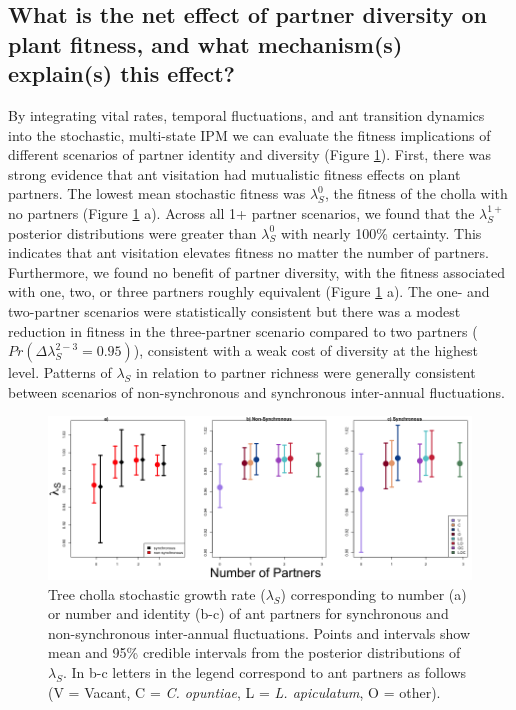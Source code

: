 \documentclass[11pt]{article}
\begin{document}
\subsection*{What is the net effect of partner diversity on plant fitness, and what mechanism(s) explain(s) this effect?}
By integrating vital rates, temporal fluctuations, and ant transition dynamics into the stochastic, multi-state IPM we can evaluate the fitness implications of different scenarios of partner identity and diversity (Figure \ref{fig:LambdaMeans}). 
First, there was strong evidence that ant visitation had mutualistic fitness effects on plant partners. 
The lowest mean stochastic fitness was $\lambda^{0}_{S}$, the fitness of the cholla with no partners (Figure \ref{fig:LambdaMeans} a).
Across all 1+ partner scenarios, we found that the $\lambda^{1+}_{S}$ posterior distributions were greater than $\lambda^{0}_{S}$ with nearly 100\% certainty.
This indicates that ant visitation elevates fitness no matter the number of partners.
Furthermore, we found no benefit of partner diversity, with the fitness associated with one, two, or three partners roughly equivalent (Figure \ref{fig:LambdaMeans} a).
The one- and two-partner scenarios were statistically consistent but there was a modest reduction in fitness in the three-partner scenario compared to two partners ($Pr(\Delta\lambda^{2-3}_{S}=0.95)$), consistent with a weak cost of diversity at the highest level.
Patterns of $\lambda_{S}$ in relation to partner richness were generally consistent between scenarios of non-synchronous and synchronous inter-annual fluctuations. 

\begin{figure}
	\includegraphics[width=0.91\linewidth]{Figures/Lambdas_Comp_lines.png}
	\caption{Tree cholla stochastic growth rate ($\lambda_{S}$) corresponding to number (a) or number and identity (b-c) of ant partners for synchronous and non-synchronous inter-annual fluctuations. Points and intervals show mean and 95\% credible intervals from the posterior distributions of $\lambda_{S}$. In b-c letters in the legend correspond to ant partners as follows (V = Vacant, C = \textit{C. opuntiae}, L = \textit{L. apiculatum}, O = other).}
	\label{fig:LambdaMeans}
\end{figure}
\end{document}
